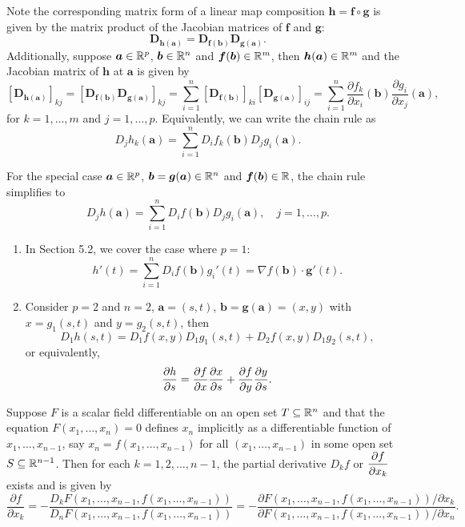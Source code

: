     \begin{remarkenv}
        Note the corresponding matrix form of a linear map composition $\bm h = \bm f \circ \bm g$ is given by the matrix product of the Jacobian matrices of $\bm f$ and $\bm g$:
        $$ \mathbf D_{\bm h(\bm a)} = \mathbf D_{\bm f(\bm b)} \mathbf D_{\bm g(\bm a)}. $$
        Additionally, suppose $\bm a \in \mathbb{R}^p$, $\bm b \in \mathbb{R}^n$ and $\bm f(\bm b) \in \mathbb{R}^m$, then $\bm h(\bm a) \in \mathbb{R}^m$ and the Jacobian matrix of $\bm h$ at $\bm a$ is given by
        $$ \left[ \mathbf D_{\bm h(\bm a)} \right]_{kj} = \left[ \mathbf D_{\bm f(\bm b)} \mathbf D_{\bm g(\bm a)} \right]_{kj} = \sum_{i=1}^n \left[ \mathbf D_{\bm f(\bm b)} \right]_{ki} \left[ \mathbf D_{\bm g(\bm a)} \right]_{ij} = \sum_{i=1}^n \frac{\partial f_k}{\partial x_i}(\bm b) \frac{\partial g_i}{\partial x_j}(\bm a), $$
        for $k=1, \ldots, m$ and $j=1, \ldots, p$. Equivalently, we can write the chain rule as
        $$ D_j h_k(\bm a) = \sum_{i=1}^n D_i f_k(\bm b) D_j g_i(\bm a). $$
    \end{remarkenv}
    \begin{exampleenv}

        For the special case $\bm a\in \mathbb{R}^p$, $\bm b = \bm g(\bm a) \in \mathbb{R}^n$ and $\bm f(\bm b) \in \mathbb{R}$, the chain rule simplifies to
        $$ D_j h(\bm a) = \sum_{i=1}^n D_i f(\bm b) D_j g_i(\bm a),\quad j=1, \ldots, p. $$
        \begin{enumerate}[label=(\arabic*), start=1]
            \item In Section 5.2, we cover the case where $p=1$:
            $$ h'(t) = \sum_{i=1}^n D_i f(\bm b) g_i'(t) = \nabla f(\bm b) \cdot \bm g'(t). $$
            \item Consider $p=2$ and $n=2$, $\bm a = (s,t)$, $\bm b = \bm g(\bm a) = (x,y)$ with $x = g_1(s,t)$ and $y = g_2(s,t)$, then
            $$ D_1 h(s,t) = D_1 f(x,y) D_1 g_1(s,t) + D_2 f(x,y) D_1 g_2(s,t), $$
            or equivalently,
            $$ \pdv{h}{s} = \pdv{f}{x} \pdv{x}{s} + \pdv{f}{y} \pdv{y}{s}. $$
        \end{enumerate}
    \end{exampleenv}
    \begin{theoremenv}
        Suppose $F$ is a scalar field differentiable on an open set $T\subseteq \mathbb{R}^n$ and that the equation $F(x_1, \ldots, x_n) = 0$ defines $x_n$ implicitly as a differentiable function of $x_1, \ldots, x_{n-1}$, say $x_n = f(x_1, \ldots, x_{n-1})$ for all $(x_1, \ldots, x_{n-1})$ in some open set $S\subseteq \mathbb{R}^{n-1}$. Then for each $k=1,2, \ldots, n-1$, the partial derivative $D_k f$ or $\displaystyle \pdv{f}{x_k}$ exists and is given by
        $$ \frac{\partial f}{\partial x_k} = -\frac{D_k F(x_1, \ldots, x_{n-1}, f(x_1, \ldots, x_{n-1}))}{D_n F(x_1, \ldots, x_{n-1}, f(x_1, \ldots, x_{n-1}))} = -\frac{\partial F(x_1, \ldots,x_{n-1}, f(x_1, \ldots, x_{n-1})) / \partial x_k}{\partial F(x_1, \ldots, x_{n-1}, f(x_1, \ldots, x_{n-1})) / \partial x_n}. $$
    \end{theoremenv}

    \newpage